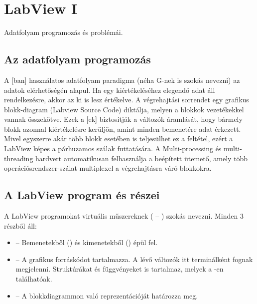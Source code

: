 \documentclass[../../main.tex]{subfiles}
\begin{document}
\clearpage

\section{LabView I}

\begin{fulltheorem}
  Adatfolyam programozás és problémái.
\end{fulltheorem}

\subsection{Az adatfolyam programozás}

A [ban] használatos adatfolyam paradigma (néha G-nek is szokás nevezni)
az adatok elérhetőségén alapul. Ha egy  kiértékeléséhez elegendő adat áll
rendelkezésre, akkor az ki is lesz értékelve. A végrehajtási sorrendet egy
grafikus blokk-diagram (Labview Source Code) diktálja, melyen a blokkok
vezetékekkel vannak összekötve. Ezek a [ek] biztosítják a változók
áramlását, hogy bármely blokk azonnal kiértékelésre kerüljön, amint minden
bemenetére adat érkezett. Mivel egyszerre akár több blokk esetében is
teljesülhet ez a feltétel, ezért a LabView képes a párhuzamos szálak futtatására.
A Multi-processing és multi-threading hardvert automatikusan felhasználja a
beépített ütemető, amely több operációsrendszer-szálat multiplexel a
végrehajtásra váró blokkokra.

\subsection{A LabView program és részei}

A LabView programokat  virtuális műszereknek ( -- )
szokás nevezni. Minden  3 részből áll:
\begin{itemize}
  \item {} --
        Bemenetekből () és kimenetekből () épül fel.
  \item {} --
        A grafikus forráskódot tartalmazza. A  lévő változók
        itt terminálként fognak megjelenni. Struktúrákat és függvényeket is
        tartalmaz, melyek a -en találhatóak.
  \item {} --
        A  blokkdiagrammon való reprezentációját határozza meg.
\end{itemize}
\end{document}
